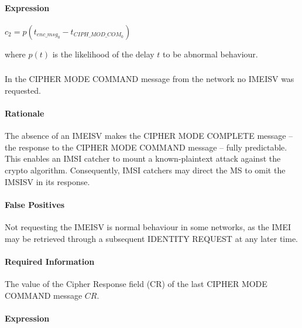 \documentclass[a4paper,11pt,notitlepage,bigheadings,oneside]{scrartcl}
\begin{document}
\paragraph{Expression}

$c_2 = p(t_{enc\_msg_0} - t_{CIPH\_MOD\_COM_0})$

where $p(t)$ is the likelihood of the delay $t$ to be abnormal behaviour.


\subsubsection{}

In the CIPHER MODE COMMAND message from the network no IMEISV was requested.

\paragraph{Rationale}

The absence of an IMEISV makes the CIPHER MODE COMPLETE message -- the response
to the CIPHER MODE COMMAND message -- fully predictable. This enables an IMSI
catcher to mount a known-plaintext attack against the crypto algorithm.
Consequently, IMSI catchers may direct the MS to omit the IMSISV in its
response.

\paragraph{False Positives}

Not requesting the IMEISV is normal behaviour in some networks, as the IMEI may
be retrieved through a subsequent IDENTITY REQUEST at any later time.

\paragraph{Required Information}

The value of the Cipher Response field (CR) of the last CIPHER MODE COMMAND
message $CR$.

\paragraph{Expression}
\end{document}
